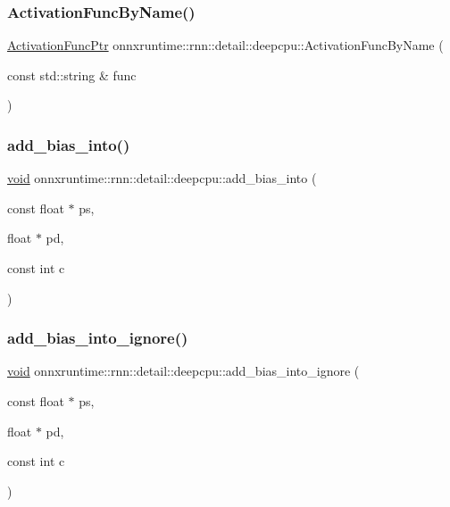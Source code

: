\subsubsection{\texorpdfstring{Activation\+Func\+By\+Name()}{ActivationFuncByName()}}
{\footnotesize\ttfamily \mbox{\hyperlink{namespaceonnxruntime_1_1rnn_1_1detail_1_1deepcpu_a84524fa5e01a6b98b4bb83052910a9a6}{Activation\+Func\+Ptr}} onnxruntime\+::rnn\+::detail\+::deepcpu\+::\+Activation\+Func\+By\+Name (\begin{DoxyParamCaption}\item[{const std\+::string \&}]{func }\end{DoxyParamCaption})}

\mbox{\label{namespaceonnxruntime_1_1rnn_1_1detail_1_1deepcpu_a1d9034a17f1cfa963791766930c88649}} 
\subsubsection{\texorpdfstring{add\+\_\+bias\+\_\+into()}{add\_bias\_into()}}
{\footnotesize\ttfamily \mbox{\hyperlink{mlasi_8h_a88f941d423cb2a819b70a1358982b1a6}{void}} onnxruntime\+::rnn\+::detail\+::deepcpu\+::add\+\_\+bias\+\_\+into (\begin{DoxyParamCaption}\item[{const float $\ast$}]{ps,  }\item[{float $\ast$}]{pd,  }\item[{const int}]{c }\end{DoxyParamCaption})}

\mbox{\label{namespaceonnxruntime_1_1rnn_1_1detail_1_1deepcpu_a21971e995528934d1c65711f56bdeafd}} 
\subsubsection{\texorpdfstring{add\+\_\+bias\+\_\+into\+\_\+ignore()}{add\_bias\_into\_ignore()}}
{\footnotesize\ttfamily \mbox{\hyperlink{mlasi_8h_a88f941d423cb2a819b70a1358982b1a6}{void}} onnxruntime\+::rnn\+::detail\+::deepcpu\+::add\+\_\+bias\+\_\+into\+\_\+ignore (\begin{DoxyParamCaption}\item[{const float $\ast$}]{ps,  }\item[{float $\ast$}]{pd,  }\item[{const int}]{c }\end{DoxyParamCaption})}

